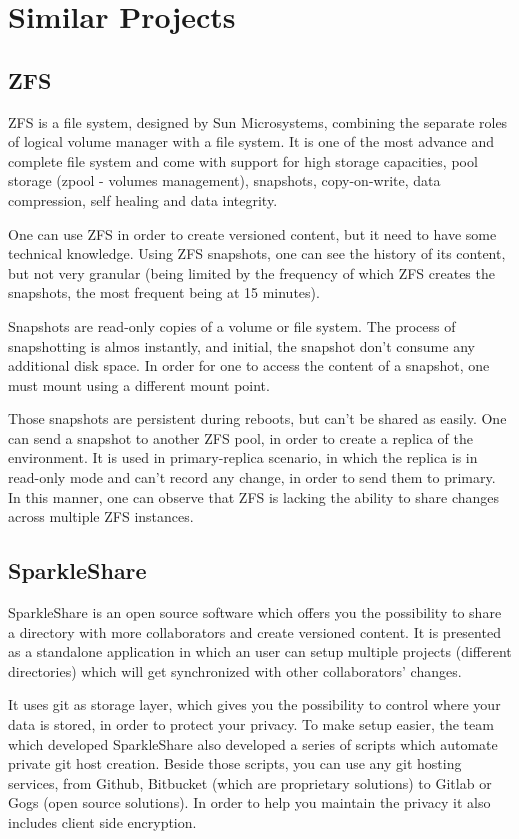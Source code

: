 \section{Similar Projects}
    \subsection{ZFS}
        ZFS is a file system, designed by Sun Microsystems, combining the separate roles of logical volume manager with a file system. It is one of the most advance and complete file system and come with support for high storage capacities, pool storage (zpool - volumes management), snapshots, copy-on-write, data compression, self healing and data integrity.

        One can use ZFS in order to create versioned content, but it need to have some technical knowledge. Using ZFS snapshots, one can see the history of its content, but not very granular (being limited by the frequency of which ZFS creates the snapshots, the most frequent being at 15 minutes).

        Snapshots are read-only copies of a volume or file system. The process of snapshotting is almos instantly, and initial, the snapshot don't consume any additional disk space. In order for one to access the content of a snapshot, one must mount using a different mount point.

        Those snapshots are persistent during reboots, but can't be shared as easily. One can send a snapshot to another ZFS pool, in order to create a replica of the environment. It is used in primary-replica scenario, in which the replica is in read-only mode and can't record any change, in order to send them to primary. In this manner, one can observe that ZFS is lacking the ability to share changes across multiple ZFS instances.

    \subsection{SparkleShare}
        SparkleShare is an open source software which offers you the possibility to share a directory with more collaborators and create versioned content. It is presented as a standalone application in which an user can setup multiple projects (different directories) which will get synchronized with other collaborators' changes.

        It uses git as storage layer, which gives you the possibility to control where your data is stored, in order to protect your privacy. To make setup easier, the team which developed SparkleShare also developed a series of scripts which automate private git host creation. Beside those scripts, you can use any git hosting services, from Github, Bitbucket (which are proprietary solutions) to Gitlab or Gogs (open source solutions).
        In order to help you maintain the privacy it also includes client side encryption.

